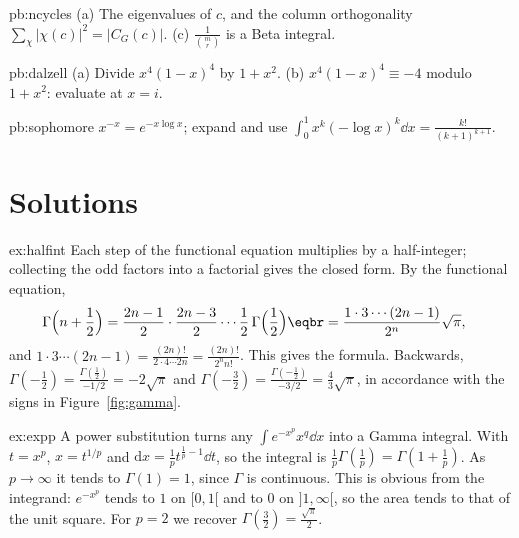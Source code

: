 \begin{hint}{pb:ncycles}
(a) The eigenvalues of $c$, and the column orthogonality $\sum_\chi|\chi(c)|^2=|C_G(c)|$. (c) $\frac1{\binom mr}$ is a Beta
integral.
\end{hint}

\begin{hint}{pb:dalzell}
(a) Divide $x^4(1-x)^4$ by $1+x^2$. (b) $x^4(1-x)^4\equiv-4$ modulo $1+x^2$: evaluate at $x=i$.
\end{hint}

\begin{hint}{pb:sophomore}
$x^{-x}=e^{-x\log x}$; expand and use $\int_0^1x^k(-\log x)^k\dd x=\frac{k!}{(k+1)^{k+1}}$.
\end{hint}

\section{Solutions}

\begin{solution}{ex:halfint}
\idea Each step of the functional equation multiplies by a half-integer; collecting the odd factors into a factorial gives
the closed form.
\writeup By the functional equation,
\[
\begin{aligned}\Gamma\Bigl(n+\frac12\Bigr)&=\frac{2n-1}2\cdot\frac{2n-3}2\cdots\frac12\,\Gamma\Bigl(\frac12\Bigr)\eqbr=\frac{1\cdot3\cdots(2n-1)}{2^n}\sqrt\pi,\end{aligned}
\]
and
$1\cdot3\cdots(2n-1)=\frac{(2n)!}{2\cdot4\cdots2n}=\frac{(2n)!}{2^nn!}$. This gives the formula. Backwards, $\Gamma(-\frac12)=\frac{\Gamma(\frac12)}{-1/2}=-2\sqrt\pi$
and $\Gamma(-\frac32)=\frac{\Gamma(-\frac12)}{-3/2}=\frac43\sqrt\pi$, in accordance with the signs in Figure~\ref{fig:gamma}.
\end{solution}

\begin{solution}{ex:expp}
\idea A power substitution turns any $\int e^{-x^p}x^q\dd x$ into a Gamma integral.
\writeup With $t=x^p$, $x=t^{1/p}$ and $\mathrm dx=\frac1pt^{\frac1p-1}\dd t$, so the integral is $\frac1p\Gamma(\frac1p)=\Gamma(1+\frac1p)$. As $p\to\infty$
it tends to $\Gamma(1)=1$, since $\Gamma$ is continuous. This is obvious from the integrand: $e^{-x^p}$ tends to $1$ on $[0,1[$ and to
$0$ on $]1,\infty[$, so the area tends to that of the unit square. For $p=2$ we recover $\Gamma(\frac32)=\frac{\sqrt\pi}2$.
\end{solution}

